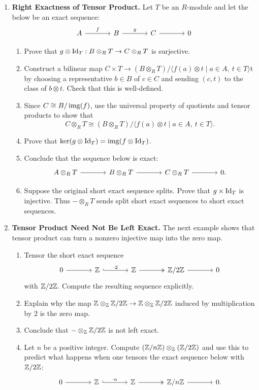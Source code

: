 \documentclass[12pt,reqno]{amsart}
\begin{document}
\begin{enumerate}[leftmargin=*, resume=problems]
\item \textbf{Right Exactness of Tensor Product.} Let $T$ be an $R$-module and let the below be an exact sequence:
\[
\begin{tikzcd}[column sep=large]
A \arrow[r, "f"] & B \arrow[r, "g"] & C \arrow[r] & 0
\end{tikzcd}
\]
\begin{enumerate}
\item Prove that $g\otimes \operatorname{Id}_T:B\otimes_R T\to C\otimes_R T$ is surjective.
\item Construct a bilinear map $C\times T\to (B\otimes_R T)/\langle f(a)\otimes t\mid a\in A,\ t\in T\rangle$t by choosing a representative $b\in B$ of $c\in C$ and sending $(c,t)$ to the class of $b\otimes t$. Check that this is well-defined.
\item Since $C\cong B/\operatorname{img}(f)$, use the universal property of quotients and tensor products to show that
\[
C\otimes_R T\cong (B\otimes_R T)/\langle f(a)\otimes t\mid a\in A,\ t\in T\rangle.
\]
\item Prove that $\ker(g\otimes \operatorname{Id}_T)=\operatorname{img}(f\otimes \operatorname{Id}_T)$.

\item Conclude that the sequence below is exact:
\[
\begin{tikzcd}[column sep=large]
A\otimes_R T \arrow[r] & B\otimes_R T \arrow[r] & C\otimes_R T \arrow[r] & 0.
\end{tikzcd}
\]
 \item Suppose the original short exact sequence splits. Prove that $g \times \operatorname{Id}_{T}$ is injective. Thus $-\otimes_{R}T$ sends split short exact sequences to short exact sequences.
\end{enumerate}

\item \textbf{Tensor Product Need Not Be Left Exact.} The next example shows that tensor product can turn a nonzero injective map into the zero map.
\begin{enumerate}
\item Tensor the short exact sequence
\[
\begin{tikzcd}[column sep=large]
0 \arrow[r] & \ZZ \arrow[r, hook, "\cdot 2"] & \ZZ \arrow[r, two heads] & \ZZ/2\ZZ \arrow[r] & 0
\end{tikzcd}
\]
with $\mathbb{Z}/2\mathbb{Z}$. Compute the resulting sequence explicitly.
\item Explain why the map $\mathbb{Z}\otimes_{\mathbb{Z}}\mathbb{Z}/2\mathbb{Z} \to \mathbb{Z}\otimes_{\mathbb{Z}}\mathbb{Z}/2\mathbb{Z}$ induced by multiplication by $2$ is the zero map.
\item Conclude that $-\otimes_{\mathbb{Z}}\mathbb{Z}/2\mathbb{Z}$ is not left exact.
\item Let $n$ be a positive integer. Compute $(\mathbb{Z}/n\mathbb{Z})\otimes_{\mathbb{Z}}(\mathbb{Z}/2\mathbb{Z})$ and use this to predict what happens when one tensors the exact sequence below with $\mathbb{Z}/2\mathbb{Z}$:
\[
\begin{tikzcd}[column sep=large]
0 \arrow[r] & \ZZ \arrow[r, hook, "\cdot n"] & \ZZ \arrow[r, two heads] & \ZZ/n\ZZ \arrow[r] & 0.
\end{tikzcd}
\]
\end{enumerate}


\end{enumerate}
\end{document}
